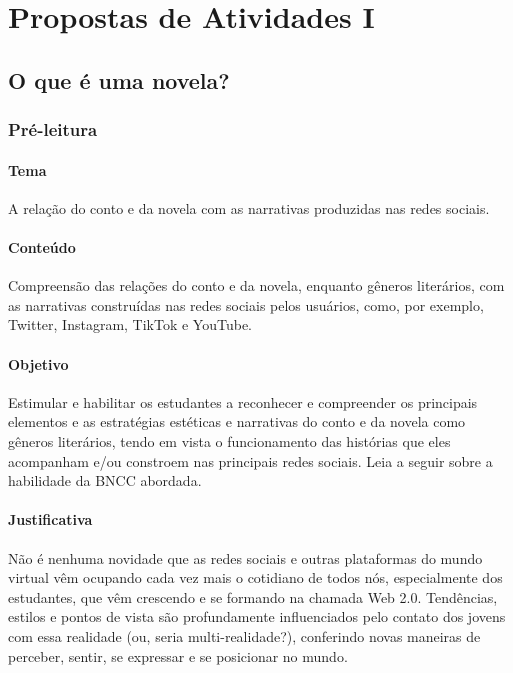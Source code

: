 \documentclass[12pt]{extarticle}
\begin{document}
\tableofcontents


\section{Propostas de Atividades I}

\subsection{O que é uma novela?}

\subsubsection{Pré-leitura}



\paragraph{Tema} A relação do conto e da novela com as narrativas produzidas nas redes sociais. 

\paragraph{Conteúdo} Compreensão das relações do conto e da novela,
enquanto gêneros literários, com as narrativas construídas nas redes
sociais pelos usuários, como, por exemplo, Twitter, Instagram, TikTok e
YouTube.

\paragraph{Objetivo} Estimular e habilitar os estudantes a reconhecer e
compreender os principais elementos e as estratégias estéticas e
narrativas do conto e da novela como gêneros literários, tendo em vista
o funcionamento das histórias que eles acompanham e/ou constroem nas
principais redes sociais. 
Leia a seguir sobre a habilidade da BNCC abordada.



\paragraph{Justificativa} Não é nenhuma novidade que as redes sociais e
outras plataformas do mundo virtual vêm ocupando cada vez mais o
cotidiano de todos nós, especialmente dos estudantes, que vêm crescendo
e se formando na chamada Web 2.0. Tendências, estilos e pontos de vista
são profundamente influenciados pelo contato dos jovens com essa
realidade (ou, seria multi-realidade?), conferindo novas maneiras de
perceber, sentir, se expressar e se posicionar no mundo.
\end{document}
